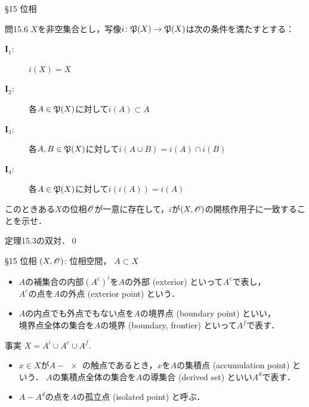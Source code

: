 \documentclass[uplatex,a4paper,dvipdfmx,aspectratio=169,11pt]{beamer}
\begin{document}
\begin{frame}[fragile]{\S 15 位相}
    \begin{exampleblock}{問15.6}
        $X$を非空集合とし，写像$i \colon \mathord{\mathfrak{P}}\qty(X) \to \mathord{\mathfrak{P}}\qty(X)$は次の条件を満たすとする：
        \begin{description}
            \item[$\textbf{I}_1$:] $i(X) = X$
            \item[$\textbf{I}_2$:] 各$A \in \mathord{\mathfrak{P}}\qty(X)$に対して$i(A) \subset A$
            \item[$\textbf{I}_3$:] 各$A, B \in \mathord{\mathfrak{P}}\qty(X)$に対して$i(A \cup B) = i(A) \cap i(B)$
            \item[$\textbf{I}_4$:] 各$A \in \mathord{\mathfrak{P}}\qty(X)$に対して$i(i(A)) = i(A)$
        \end{description}
        このときある$X$の位相$\mathscr{O}$が一意に存在して，$i$が$(X, \mathscr{O})$の開核作用子に一致することを示せ．
    \end{exampleblock}

    \medskip{}

     \quad 定理15.3の双対．\qed
\end{frame}

\begin{frame}[fragile]{\S 15 位相}
    $(X, \mathscr{O})$: 位相空間， \quad $A \subset X$

    \medskip{}

    \begin{itemize}
        \item $A$の補集合の内部$(A^c)^i$を$A$の\alert{外部} (exterior) といって$A^e$で表し，\\$A^e$の点を$A$の\alert{外点} (exterior point) という．
        \item $A$の内点でも外点でもない点を$A$の\alert{境界点} (boundary point) といい，\\境界点全体の集合を$A$の\alert{境界} (boundary, frontier) といって$A^f$で表す．
    \end{itemize}
    \begin{block}{事実}
        \centering
        $X = A^i \cup A^e \cup A^f$.
    \end{block}
    \begin{itemize}
        \item $x \in X$が$A - \qty{x}$の触点であるとき，$x$を$A$の\alert{集積点} (accumulation point) という．
            $A$の集積点全体の集合を$A$の\alert{導集合} (derived set) といい$A^d$で表す．
        \item $A - A^d$の点を$A$の\alert{孤立点} (isolated point) と呼ぶ．
    \end{itemize}

\end{frame}
\end{document}
